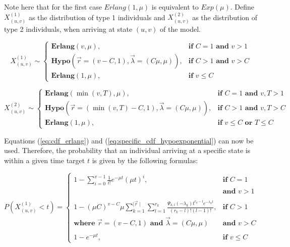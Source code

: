 Note here that for the first case \(Erlang(1, \mu)\) is equivalent to
\(Exp(\mu)\).
Define \(X_{(u,v)}^{(1)}\) as the distribution of type 1 individuals and
\(X_{(u,v)}^{(2)}\) as the distribution of type 2 individuals, when arriving at
state \((u,v)\) of the model.

\small
\begin{equation}
    X_{(u,v)}^{(1)} \sim
    \begin{cases}
        \textbf{Erlang}(v, \mu), & \textbf{if } C = 1 \textbf{ and } v>1 \\
        \textbf{Hypo}\left(\vec{r}=(v - C, 1), \vec{\lambda}=(C \mu, \mu)\right),
            & \textbf{if } C > 1 \textbf{ and } v>C \\
        \textbf{Erlang}(1, \mu), & \textbf{if } v \leq C
    \end{cases}
\end{equation}

\begin{equation}
    X_{(u,v)}^{(2)} \sim
    \begin{cases}
        \textbf{Erlang}(\min(v, T), \mu), & \textbf{if } C = 1
            \textbf{ and } v, T > 1 \\
        \textbf{Hypo}\left(\vec{r}=(\min(v, T) - C, 1), \vec{\lambda}=(C \mu, \mu)\right), &
            \textbf{if } C > 1 \textbf{ and } v, T  > C \\
        \textbf{Erlang}(1, \mu), & \textbf{if } v \leq C \textbf{ or } T \leq C
    \end{cases}
\end{equation}
\normalsize


Equations (\ref{eq:cdf_erlang}) and (\ref{eq:specific_cdf_hypoexponential}) can
now be used.
Therefore, the probability that an individual arriving at a specific state is
within a given time target \(t\) is given by the following formulas:


\footnotesize
\begin{equation}
    P(X_{(u,v)}^{(1)} < t) =
    \begin{cases}
        1 - \sum_{i=0}^{v-1} \frac{1}{i!} e^{-\mu t} (\mu t)^i,
            & \textbf{if } C = 1 \\
        & \textbf{and } v > 1 \\
        & \\
        1 - (\mu C)^{v-C} \mu
            \sum_{k=1}^{\mid \vec{r} \mid} \sum_{l=1}^{r_k}
            \frac{\Psi_{k,l}(-\lambda_k)t^{r_k - l}
            e^{-\lambda_k t}}{(r_k - l)! (l - 1)!},
            & \textbf{if } C > 1 \\
        \textbf{where } \vec{r}=(v - C, 1) \textbf{ and }
            \vec{\lambda}=(C \mu, \mu) & \textbf{and } v > C \\
        & \\
        1 - e^{-\mu t},  & \textbf{if } v \leq C
    \end{cases}
\end{equation}

